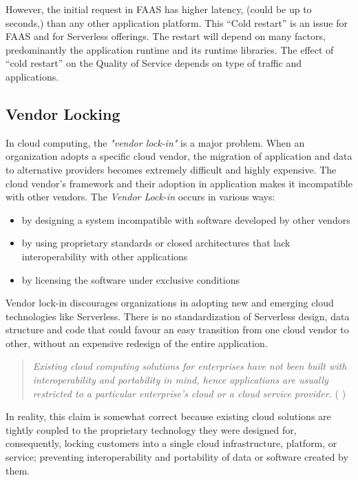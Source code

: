 \documentclass{article}
\begin{document}
\begin{flushleft}
However, the initial request in \gls{FAAS} has higher latency, (could be up to seconds,) than any other application platform. This “Cold restart” is an issue for \gls{FAAS} and for Serverless offerings. The restart will depend on many factors, predominantly the application runtime and its runtime libraries. The effect of “cold restart” on the Quality of Service depends on type of traffic and applications. 

\subsection{Vendor Locking}
In cloud computing, the \textit{"vendor lock-in"} is a major problem. When an organization adopts a specific cloud vendor, the migration of application and data to alternative providers becomes extremely difficult and highly expensive. The cloud vendor's framework and their adoption in application makes it incompatible with other vendors.
 The \textit{Vendor Lock-in} occurs in various ways: 
 \begin{itemize}
     \item by designing a system incompatible with software developed by other vendors
     \item by using proprietary standards or closed architectures that lack interoperability with other applications
     \item by licensing the software under exclusive conditions
 \end{itemize}

 Vendor lock-in discourages organizations in adopting new and emerging cloud technologies like Serverless. There is no standardization of Serverless design, data structure and code that could favour an easy transition from one cloud vendor to other, without an expensive redesign of the entire application. 

 \begin{quote}
 \textit{
Existing cloud computing solutions for enterprises have not been built with interoperability and portability in mind, hence applications are usually restricted to a particular enterprise's cloud or a cloud service provider.}  
( \cite{Opara-Martins-2014} )
\end{quote}
\par 
In reality, this claim is somewhat correct because existing cloud solutions are tightly coupled to the proprietary technology they were designed for, consequently, locking customers into a single cloud infrastructure, platform, or service; preventing interoperability and portability of data or software created by them. 
\end{flushleft}
\end{document}
